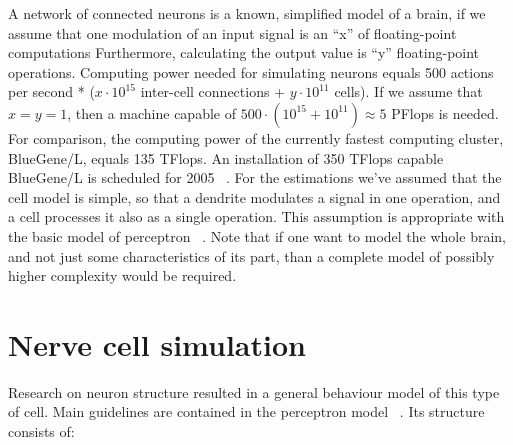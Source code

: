 \documentclass[10pt,oneside]{memoir}
\begin{document}
A network of connected neurons is a known, simplified model of a brain, if we assume that one modulation of an input signal is an ``x'' of floating-point computations
Furthermore, calculating the output value is ``y'' floating-point operations. Computing power needed for simulating neurons equals 500 actions per second * ($ x\cdot {10}^{15}$ inter-cell connections + $ y\cdot {10}^{11}$ cells). If we assume that $ x=y=1$, then a machine capable of $ 500\cdot ({10}^{15}+{10}^{11})\approx 5$ PFlops is needed. For comparison, the computing power of the currently fastest computing cluster, BlueGene/L, equals 135 TFlops. An installation of 350 TFlops capable BlueGene/L is scheduled for 2005 ~\cite{IBM:2005:Bluegene}.
For the estimations we've assumed that the cell model is simple, so that a dendrite modulates a signal in one operation, and a cell processes it also as a single operation. This assumption is appropriate with the basic model of perceptron ~\cite{Camargo:1990}. Note that if one want to model the whole brain, and not just some characteristics of its part, than a complete model of possibly higher complexity would be required.


\chapter{Nerve cell simulation}
\label{nervecellsimulation}

Research on neuron structure resulted in a general behaviour model of this type of cell. Main guidelines are contained in the perceptron model ~\cite{Tadeusiewicz:1993}. Its structure consists of:


\begin{figure}
\begin{center}
\end{center}
\label{figure1}
\end{figure}
\end{document}
